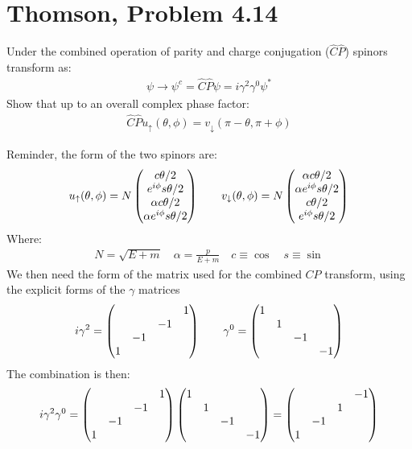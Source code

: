 \documentclass[12pt]{article}
\begin{document}
\section{Thomson, Problem 4.14}
\begin{problem}
  Under the combined operation of parity and charge conjugation ($\hat{C}\hat{P}$) spinors transform as:
  \begin{align*}
    \psi\to\psi^c=\hat{C}\hat{P}\psi=i\gamma^2\gamma^0\psi^*
  \end{align*}
  Show that up to an overall complex phase factor:
  \begin{align*}
    \hat{C}\hat{P}u_{\uparrow}(\theta,\phi)=v_{\downarrow}(\pi-\theta,\pi+\phi)
  \end{align*}
\end{problem}
Reminder, the form of the two spinors are:
\begin{align*}
  u_{\uparrow}(\theta,\phi)=N
  \pmqty{c\theta/2\\e^{i\phi}s\theta/2\\
    \alpha c\theta/2\\\alpha e^{i\phi} s\theta/2}
  \qquad
  v_{\downarrow}(\theta,\phi)=N
  \pmqty{\alpha c\theta/2\\\alpha e^{i\phi}s\theta/2\\
    c\theta/2\\ e^{i\phi} s\theta/2}
\end{align*}
Where:
\begin{align*}
  N=\sqrt{E+m}\quad\alpha=\frac{p}{E+m}\quad c\equiv\cos\quad s\equiv\sin
\end{align*}
We then need the form of the matrix used for the combined $CP$ transform, using the explicit forms of the $\gamma$ matrices
\begin{align*}
  i\gamma^2=\pmqty{&&&1\\&&-1&\\&-1&&\\1&&&}
  \qquad
  \gamma^0=\pmqty{1\\&1\\&&-1\\&&&-1}
\end{align*}
The combination is then:
\begin{align*}
  i\gamma^2\gamma^0=
  \pmqty{&&&1\\&&-1&\\&-1&&\\1&&&}\pmqty{1\\&1\\&&-1\\&&&-1}
  =\pmqty{&&&-1\\&&1&\\&-1&&\\1&&&}
\end{align*}
\end{document}
